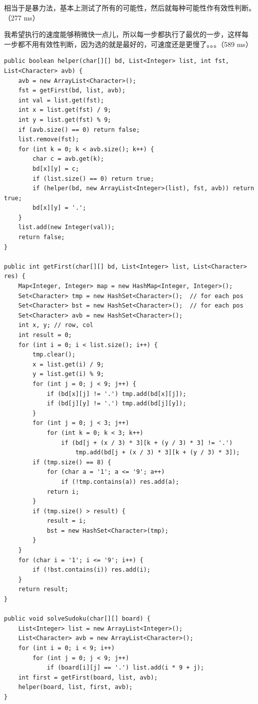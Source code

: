 \documentclass[12pt]{book}
\begin{document}
相当于是暴力法，基本上测试了所有的可能性，然后就每种可能性作有效性判断。（277 ms）

我希望执行的速度能够稍微快一点儿，所以每一步都执行了最优的一步，这样每
一步都不用有效性判断，因为选的就是最好的，可速度还是更慢了。。。（589
ms）

\lstset{language=java,label= ,caption= ,numbers=none}
\begin{lstlisting}
public boolean helper(char[][] bd, List<Integer> list, int fst, List<Character> avb) {
    avb = new ArrayList<Character>();
    fst = getFirst(bd, list, avb);
    int val = list.get(fst);
    int x = list.get(fst) / 9;
    int y = list.get(fst) % 9;
    if (avb.size() == 0) return false;
    list.remove(fst);
    for (int k = 0; k < avb.size(); k++) {
        char c = avb.get(k);
        bd[x][y] = c;
        if (list.size() == 0) return true;
        if (helper(bd, new ArrayList<Integer>(list), fst, avb)) return true;
        bd[x][y] = '.';
    }
    list.add(new Integer(val));
    return false;
}

public int getFirst(char[][] bd, List<Integer> list, List<Character> res) {
    Map<Integer, Integer> map = new HashMap<Integer, Integer>();
    Set<Character> tmp = new HashSet<Character>();  // for each pos
    Set<Character> bst = new HashSet<Character>();  // for each pos
    Set<Character> avb = new HashSet<Character>();
    int x, y; // row, col
    int result = 0;
    for (int i = 0; i < list.size(); i++) {
        tmp.clear();
        x = list.get(i) / 9;
        y = list.get(i) % 9;
        for (int j = 0; j < 9; j++) {
            if (bd[x][j] != '.') tmp.add(bd[x][j]);
            if (bd[j][y] != '.') tmp.add(bd[j][y]);
        }
        for (int j = 0; j < 3; j++) 
            for (int k = 0; k < 3; k++) 
                if (bd[j + (x / 3) * 3][k + (y / 3) * 3] != '.')
                    tmp.add(bd[j + (x / 3) * 3][k + (y / 3) * 3]);
        if (tmp.size() == 8) {
            for (char a = '1'; a <= '9'; a++)
                if (!tmp.contains(a)) res.add(a);
            return i;
        }
        if (tmp.size() > result) {
            result = i; 
            bst = new HashSet<Character>(tmp);
        }
    }
    for (char i = '1'; i <= '9'; i++) {
        if (!bst.contains(i)) res.add(i);
    }
    return result;
}

public void solveSudoku(char[][] board) {
    List<Integer> list = new ArrayList<Integer>();
    List<Character> avb = new ArrayList<Character>();
    for (int i = 0; i < 9; i++) 
        for (int j = 0; j < 9; j++) 
            if (board[i][j] == '.') list.add(i * 9 + j);
    int first = getFirst(board, list, avb);
    helper(board, list, first, avb);
}
\end{lstlisting}
\end{document}
